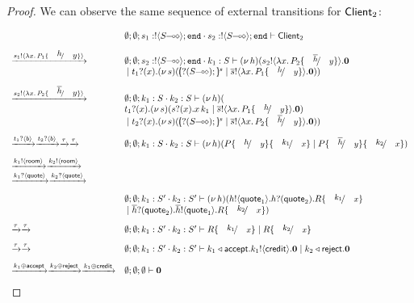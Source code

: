 \begin{proof}
	We can observe the same sequence of external transitions for $\mathsf{Client}_2$:

\[
	\begin{array}{ll}
		& \es; \es; s_1: \btout{\lhot{S}} \tinact \cat s_2: \btout{\lhot{S}} \tinact \proves \Client_2
\\[3mm]

		\by{\bactout{s_1}{\abs{x}{P_1 \subst{h}{y}}}}&
		\es; \es; s_2: \btout{\lhot{S}} \tinact \cat k_1: S \proves \newsp{h}{\bout{s_2}{\abs{x}{P_2 \subst{\dual{h}}{y}}} \inact\\
		& \Par \binp{t_1}{x} \newsp{s}{\mapchar{\btinp{\lhot{S}}}{s} \Par \bout{\dual{s}}{\abs{x}{P_1 \subst{h}{y}}} \inact }}
\\[3mm]

		\by{\bactout{s_2}{\abs{x}{P_2 \subst{\dual{h}}{y}}}}&
		\es; \es; k_1: S \cat k_2: S \proves \newsp{h}{\\
		& \binp{t_1}{x} \newsp{s}{\binp{s}{x} \appl{x}{k_1} \Par \bout{\dual{s}}{\abs{x}{P_1 \subst{h}{y}}} \inact }\\
		& \Par \binp{t_2}{x} \newsp{s}{\mapchar{\btinp{\lhot{S}}}{s} \Par \bout{\dual{s}}{\abs{x}{P_2 \subst{\dual{h}}{y}}} \inact }}
\\[3mm]

		\by{\bactinp{t_1}{b}} \by{\bactinp{t_2}{b}} \by{\tau}\by{\tau}&
		\es; \es; k_1: S \cat k_2: S \proves \newsp{h}{
		P\subst{h}{y} \subst{k_1}{x} \Par P\subst{\dual{h}}{y} \subst{k_2}{x}}
\\[3mm]

		\by{\bactout{k_1}{\rtype}} \by{\bactout{k_2}{\rtype}}&
\\
		\by{\bactinp{k_1}{\Quote}} \by{\bactinp{k_2}{\Quote}}&
\\[3mm]

		& \es; \es; k_1: S' \cat k_2: S' \proves \newsp{h}{
		\bout{h}{\Quote_1} \binp{h}{\Quote_2} R \subst{k_1}{x} \\
		& \Par \binp{\dual{h}}{\Quote_2} \bout{\dual{h}}{\Quote_1} R \subst{k_2}{x}}
\\[3mm]
		\by{\tau} \by{\tau}&
		\es; \es; k_1: S' \cat k_2: S' \proves R \subst{k_1}{x} \Par R \subst{k_2}{x}
\\[3mm]
		\by{\tau} \by{\tau}&
		\es; \es; k_1: S' \cat k_2: S' \proves
		\bsel{k_1}{\accept} \bout{k_1}{\creditc} \inact 
		\Par \bsel{k_2}{\reject} \inact
\\[3mm]
		\by{\bactsel{k_1}{\accept}} \by{\bactsel{k_2}{\reject}} \by{\bactsel{k_1}{\creditc}}&
		\es; \es; \es \proves \inact
	\end{array}
\]
\end{proof}

